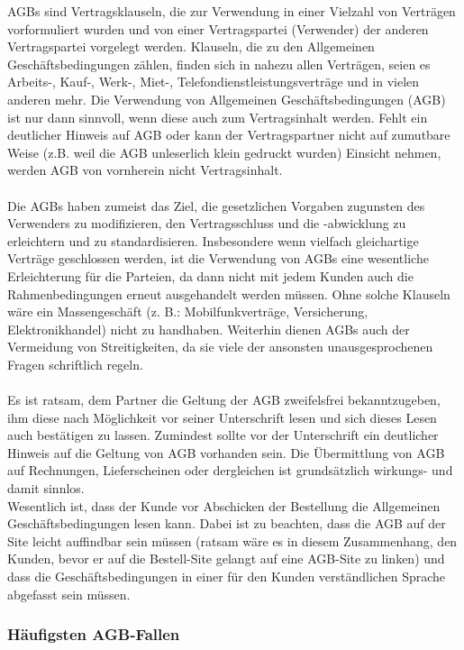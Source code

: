 \documentclass[a4paper]{article}
\begin{document}
AGBs sind Vertragsklauseln, die zur Verwendung in einer Vielzahl von Verträgen vorformuliert wurden und von einer Vertragspartei (Verwender) der anderen Vertragspartei vorgelegt werden. Klauseln, die zu den Allgemeinen Geschäftsbedingungen zählen, finden sich in nahezu allen Verträgen, seien es Arbeits-, Kauf-, Werk-, Miet-, Telefondienstleistungsverträge und in vielen anderen mehr. Die Verwendung von Allgemeinen Geschäftsbedingungen (AGB) ist nur dann sinnvoll, wenn diese auch zum Vertragsinhalt werden. Fehlt ein deutlicher Hinweis auf AGB oder kann der Vertragspartner nicht auf zumutbare Weise (z.B. weil die AGB unleserlich klein gedruckt wurden) Einsicht nehmen, werden AGB von vornherein nicht Vertragsinhalt.\\\\
Die AGBs haben zumeist das Ziel, die gesetzlichen Vorgaben zugunsten des Verwenders zu modifizieren, den Vertragsschluss und die -abwicklung zu erleichtern und zu standardisieren. Insbesondere wenn vielfach gleichartige Verträge geschlossen werden, ist die Verwendung von AGBs eine wesentliche Erleichterung für die Parteien, da dann nicht mit jedem Kunden auch die Rahmenbedingungen erneut ausgehandelt werden müssen. Ohne solche Klauseln wäre ein Massengeschäft (z. B.: Mobilfunkverträge, Versicherung, Elektronikhandel) nicht zu handhaben. Weiterhin dienen AGBs auch der Vermeidung von Streitigkeiten, da sie viele der ansonsten unausgesprochenen Fragen schriftlich regeln.\\\\
Es ist ratsam, dem Partner die Geltung der AGB zweifelsfrei bekanntzugeben, ihm diese nach Möglichkeit vor seiner Unterschrift lesen und sich dieses Lesen auch bestätigen zu lassen. Zumindest sollte vor der Unterschrift ein deutlicher Hinweis auf die Geltung von AGB vorhanden sein. Die Übermittlung von AGB auf Rechnungen, Lieferscheinen oder dergleichen ist grundsätzlich wirkungs- und damit sinnlos.\\
Wesentlich ist, dass der Kunde vor Abschicken der Bestellung die Allgemeinen Geschäftsbedingungen lesen kann. Dabei ist zu beachten, dass die AGB auf der Site leicht auffindbar sein müssen (ratsam wäre es in diesem Zusammenhang, den Kunden, bevor er auf die Bestell-Site gelangt auf eine AGB-Site zu linken) und dass die Geschäftsbedingungen in einer für den Kunden verständlichen Sprache abgefasst sein müssen.

\subsubsection{Häufigsten AGB-Fallen}
\end{document}
